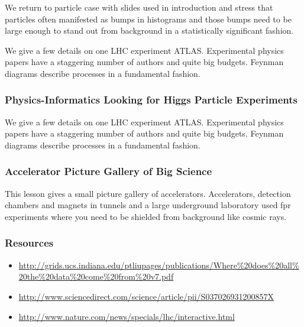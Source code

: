 We return to particle case with slides used in introduction and stress
that particles often manifested as bumps in histograms and those bumps
need to be large enough to stand out from background in a statistically
significant fashion.


We give a few details on one LHC experiment ATLAS. Experimental physics
papers have a staggering number of authors and quite big budgets.
Feynman diagrams describe processes in a fundamental fashion.


\subsubsection{Physics-Informatics Looking for Higgs Particle
Experiments}\label{physics-informatics-looking-for-higgs-particle-experiments}

We give a few details on one LHC experiment ATLAS. Experimental physics
papers have a staggering number of authors and quite big budgets.
Feynman diagrams describe processes in a fundamental fashion.


\subsubsection{Accelerator Picture Gallery of Big
Science}\label{accelerator-picture-gallery-of-big-science}

This lesson gives a small picture gallery of accelerators. Accelerators,
detection chambers and magnets in tunnels and a large underground
laboratory used fpr experiments where you need to be shielded from
background like cosmic rays.


\subsubsection{Resources}\label{resources}

\begin{itemize}

\item
  \url{http://grids.ucs.indiana.edu/ptliupages/publications/Where\%20does\%20all\%20the\%20data\%20come\%20from\%20v7.pdf}
\item
  \url{http://www.sciencedirect.com/science/article/pii/S037026931200857X}
\item
  \url{http://www.nature.com/news/specials/lhc/interactive.html}
\end{itemize}

